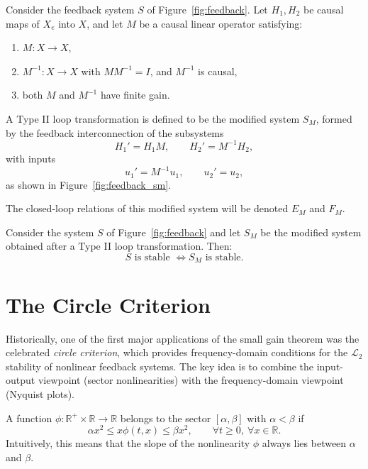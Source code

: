 \begin{definition}
Consider the feedback system $S$ of Figure~\ref{fig:feedback}.  
Let $H_1, H_2$ be causal maps of $X_e$ into $X$, and let $M$ be a causal linear operator satisfying:  

\begin{enumerate}
    \item $M: X \to X$,  
    \item $M^{-1}: X \to X$ with $MM^{-1}=I$, and $M^{-1}$ is causal,  
    \item both $M$ and $M^{-1}$ have finite gain.  
\end{enumerate}

A Type II loop transformation is defined to be the modified system $S_M$, formed by the feedback interconnection of the subsystems
\begin{equation}
H_1' = H_1 M, \qquad H_2' = M^{-1} H_2,
\end{equation}
with inputs
\begin{equation}
u_1' = M^{-1}u_1, \qquad u_2' = u_2,
\end{equation}
as shown in Figure~\ref{fig:feedback_sm}.  

The closed-loop relations of this modified system will be denoted $E_M$ and $F_M$.
\end{definition}

\begin{theorem}
Consider the system $S$ of Figure~\ref{fig:feedback} and let $S_M$ be the modified system obtained after a Type II loop transformation. Then:
\begin{equation}
S \text{ is stable } \iff S_M \text{ is stable.}
\end{equation}
\end{theorem}

\section{The Circle Criterion}

Historically, one of the first major applications of the small gain theorem was the celebrated \emph{circle criterion}, which provides frequency-domain conditions for the $\mathcal{L}_2$ stability of nonlinear feedback systems.  
The key idea is to combine the input-output viewpoint (sector nonlinearities) with the frequency-domain viewpoint (Nyquist plots).

\begin{definition}
A function $\phi:\mathbb{R}^+\times\mathbb{R}\to\mathbb{R}$ belongs to the sector $[\alpha,\beta]$ with $\alpha<\beta$ if
\begin{equation}
    \alpha x^2 \leq x\phi(t,x) \leq \beta x^2, 
    \qquad \forall t\geq 0,\ \forall x\in\mathbb{R}.
\end{equation}
Intuitively, this means that the slope of the nonlinearity $\phi$ always lies between $\alpha$ and $\beta$.
\end{definition}

